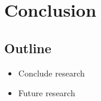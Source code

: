 
\chapter{Conclusion}

\label{Chapter7} %


\section{Outline}
\begin{itemize}
  \item Conclude research
  \item Future research
\end{itemize}